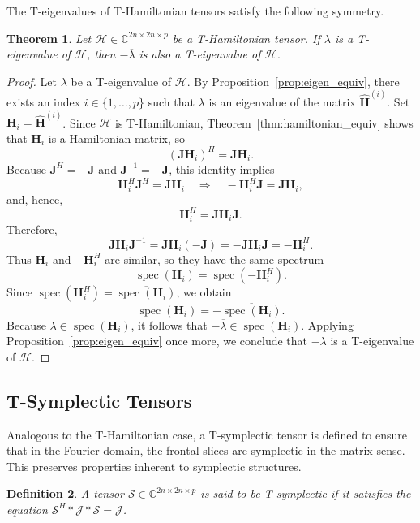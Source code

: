 \documentclass[pdflatex,sn-mathphys-ay]{sn-jnl}
\newcommand{\T}[1]{\mathcal{#1}}    %
\newcommand{\M}[1]{\bm{#1}}     %
\newcommand{\C}{\mathbb{C}}         %
\theoremstyle{thmstyleone}
\newtheorem{theorem}{Theorem}[section]
\theoremstyle{thmstyletwo}
\theoremstyle{thmstylethree}
\newtheorem{definition}[theorem]{Definition}
\numberwithin{equation}{section}
\begin{document}
The T-eigenvalues of T-Hamiltonian tensors satisfy the following symmetry.

\begin{theorem}
\label{thm:spectral_symmetry}
Let $\T{H} \in \C^{2n \times 2n \times p}$ be a T-Hamiltonian tensor. 
If $\lambda$ is a T-eigenvalue of $\T{H}$, then $-\overline{\lambda}$ is also a T-eigenvalue of $\T{H}$.
\end{theorem}
\begin{proof}
Let $\lambda$ be a T-eigenvalue of $\T{H}$. By Proposition~\ref{prop:eigen_equiv}, there exists an index $i \in \{1,\dots,p\}$ such that $\lambda$ is an eigenvalue of the matrix $\widehat{\M{H}}^{(i)}$. Set
$\M{H}_i = \widehat{\M{H}}^{(i)}$.
Since $\T{H}$ is T-Hamiltonian, Theorem~\ref{thm:hamiltonian_equiv} shows that $\M{H}_i$ is a Hamiltonian matrix, so
$$
(\M{J}\M{H}_i)^H = \M{J}\M{H}_i.
$$
Because $\M{J}^H = -\M{J}$ and $\M{J}^{-1} = -\M{J}$, this identity implies
$$
\M{H}_i^H \M{J}^H = \M{J}\M{H}_i
\quad \Longrightarrow \quad
-\M{H}_i^H \M{J} = \M{J}\M{H}_i,
$$
and, hence,
$$
\M{H}_i^H = \M{J}\M{H}_i \M{J}.
$$
Therefore,
$$
\M{J}\M{H}_i \M{J}^{-1}
=
\M{J}\M{H}_i(-\M{J})
=
-\M{J}\M{H}_i\M{J}
=
-\M{H}_i^H.
$$
Thus $\M{H}_i$ and $-\M{H}_i^H$ are similar, so they have the same spectrum
$$
\operatorname{spec}(\M{H}_i)=\operatorname{spec}(-\M{H}_i^H).
$$
Since $\operatorname{spec}(\M{H}_i^H)=\overline{\operatorname{spec}(\M{H}_i)}$, we obtain
$$
\operatorname{spec}(\M{H}_i)
=
-\overline{\operatorname{spec}(\M{H}_i)}.
$$
Because $\lambda \in \operatorname{spec}(\M{H}_i)$, it follows that $-\overline{\lambda} \in \operatorname{spec}(\M{H}_i)$. Applying Proposition~\ref{prop:eigen_equiv} once more, we conclude that $-\overline{\lambda}$ is a T-eigenvalue of $\T{H}$.
\end{proof}


\subsection{T-Symplectic Tensors}
Analogous to the T-Hamiltonian case, a T-symplectic tensor is defined to ensure that in the Fourier domain, the frontal slices are symplectic in the matrix sense.
This preserves properties
inherent to symplectic structures.

\begin{definition}
\label{def:t_symplectic}
A tensor $\T{S} \in \C^{2n \times 2n \times p}$ is said to be \emph{T-symplectic} if it satisfies the equation $\T{S}^H * \T{J} * \T{S} = \T{J}$.
\end{definition}
\end{document}
